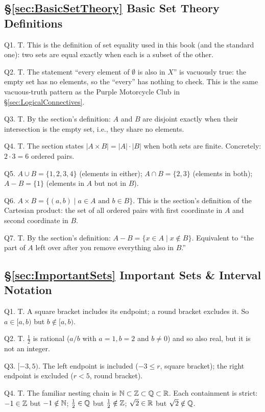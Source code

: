 \subsection*{\S\ref{sec:BasicSetTheory} Basic Set Theory Definitions}
\hypertarget{a:ch0:sets}{}
\noindent Q1. T. This is the definition of set equality used in this book (and the standard one): two sets are equal exactly when each is a subset of the other.\par\smallskip
\noindent Q2. T. The statement ``every element of $\emptyset$ is also in $X$'' is vacuously true: the empty set has no elements, so the ``every'' has nothing to check. This is the same vacuous-truth pattern as the Purple Motorcycle Club in \S\ref{sec:LogicalConnectives}.\par\smallskip
\noindent Q3. T. By the section's definition: $A$ and $B$ are disjoint exactly when their intersection is the empty set, i.e., they share no elements.\par\smallskip
\noindent Q4. T. The section states $|A \times B| = |A| \cdot |B|$ when both sets are finite. Concretely: $2 \cdot 3 = 6$ ordered pairs.\par\smallskip
\noindent Q5. $A \cup B = \{1, 2, 3, 4\}$ (elements in either); $A \cap B = \{2, 3\}$ (elements in both); $A - B = \{1\}$ (elements in $A$ but not in $B$).\par\smallskip
\noindent Q6. $A \times B = \{(a, b) \mid a \in A \text{ and } b \in B\}$. This is the section's definition of the Cartesian product: the set of all ordered pairs with first coordinate in $A$ and second coordinate in $B$.\par\smallskip
\noindent Q7. T. By the section's definition: $A - B = \{x \in A \mid x \notin B\}$. Equivalent to ``the part of $A$ left over after you remove everything also in $B$.''\par\smallskip
\hfill{}\par\medskip

\subsection*{\S\ref{sec:ImportantSets} Important Sets \& Interval Notation}
\hypertarget{a:ch0:impsets}{}
\noindent Q1. T. A square bracket includes its endpoint; a round bracket excludes it. So $a \in [a,b)$ but $b \notin [a,b)$.\par\smallskip
\noindent Q2. T. $\tfrac{1}{2}$ is rational ($a/b$ with $a=1, b=2$ and $b \neq 0$) and so also real, but it is not an integer.\par\smallskip
\noindent Q3. $[-3, 5)$. The left endpoint is included ($-3 \leq r$, square bracket); the right endpoint is excluded ($r < 5$, round bracket).\par\smallskip
\noindent Q4. T. The familiar nesting chain is ${\mathbb{N}} \subset {\mathbb{Z}} \subset {\mathbb{Q}} \subset {\mathbb{R}}$. Each containment is strict: $-1 \in {\mathbb{Z}}$ but $-1 \notin {\mathbb{N}}$; $\tfrac{1}{2} \in {\mathbb{Q}}$ but $\tfrac{1}{2} \notin {\mathbb{Z}}$; $\sqrt{2} \in {\mathbb{R}}$ but $\sqrt{2} \notin {\mathbb{Q}}$.\par\smallskip
\hfill{}\par\medskip

